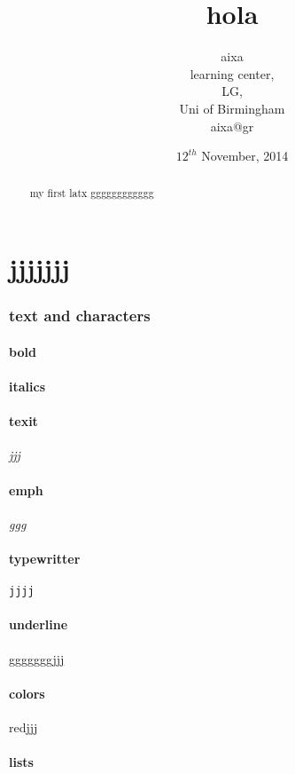 \documentclass[a4paper, 12pt, oneside] {article}
\begin{document}
\title{hola}
\date{$12^{th}$ November, 2014}
\author{aixa\\
learning center,\\
LG,\\
Uni of Birmingham\\
aixa@gr}
\maketitle
\newpage
\begin{abstract}my first latx gggggggggggg
\end{abstract}
\newpage
\tableofcontents
\newpage
\part{jjjjjjj}
\section{text and characters}
\subsection{bold}

\subsection{italics}
\subsection{texit}
\textit{jjj}
\subsection{emph}
\emph{ggg}
\subsection{typewritter}
\texttt{jjjj}
\subsection{underline}
ggggggg\underline{jjj}
\subsection{colors}
\begin{color}
{red}{jjj}
\end{color}
\subsection{lists}
\end{document}
